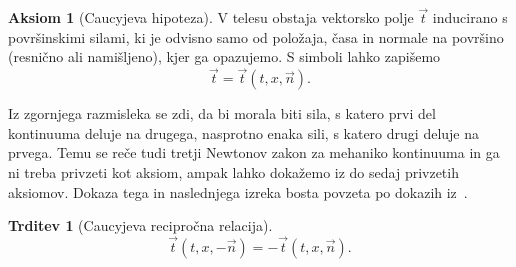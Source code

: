 \documentclass[12pt,a4paper,twoside]{article}
\theoremstyle{definition} %
\newtheorem{aksiom}{Aksiom}
\theoremstyle{plain} %
\newtheorem{trditev}[definicija]{Trditev}
\numberwithin{equation}{section}
\newcommand{\vt}{\vec{t}}
\newcommand{\vn}{\vec{n}}
\newcommand{\vx}{x}
\begin{document}
\begin{aksiom}[Caucyjeva hipoteza]
  V telesu obstaja vektorsko polje $\vt$ inducirano s površinskimi silami, ki
  je odvisno samo od položaja, časa in normale na površino (resnično ali
  namišljeno), kjer ga opazujemo.  S simboli lahko zapišemo
  \[
    \vt = \vt(t, \vx, \vn).
  \]
\end{aksiom}

Iz zgornjega razmisleka se zdi, da bi morala biti sila, s katero prvi del
kontinuuma deluje na drugega, nasprotno enaka sili, s katero drugi deluje na
prvega. Temu se reče tudi tretji Newtonov zakon za mehaniko kontinuuma in
ga ni treba privzeti kot aksiom, ampak lahko dokažemo iz do sedaj
privzetih aksiomov. Dokaza tega in naslednjega izreka bosta povzeta po dokazih
iz~\cite[str.\ 104--107]{hjelmstad2007fundamentals}.
\begin{trditev}[Caucyjeva recipročna relacija]
  \label{trd:cauchy-reciprocal}
  \begin{equation}
    \vt(t, \vx, -\vn) = -\vt(t, \vx, \vn).
    \label{eq:cauchy-reciprocal}
  \end{equation}
\end{trditev}
\end{document}
